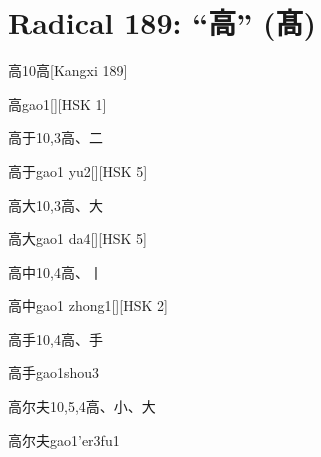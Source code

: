 
\section*{Radical 189: ``⾼'' (髙)}

\begin{entry}{高}{10}{⾼}[Kangxi 189]
  \begin{phonetics}{高}{gao1}[][HSK 1]
  \end{phonetics}
\end{entry}

\begin{entry}{高于}{10,3}{⾼、⼆}
  \begin{phonetics}{高于}{gao1 yu2}[][HSK 5]
  \end{phonetics}
\end{entry}

\begin{entry}{高大}{10,3}{⾼、⼤}
  \begin{phonetics}{高大}{gao1 da4}[][HSK 5]
  \end{phonetics}
\end{entry}

\begin{entry}{高中}{10,4}{⾼、⼁}
  \begin{phonetics}{高中}{gao1 zhong1}[][HSK 2]
  \end{phonetics}
\end{entry}

\begin{entry}{高手}{10,4}{⾼、⼿}
  \begin{phonetics}{高手}{gao1shou3}
  \end{phonetics}
\end{entry}

\begin{entry}{高尔夫}{10,5,4}{⾼、⼩、⼤}
  \begin{phonetics}{高尔夫}{gao1'er3fu1}
  \end{phonetics}
\end{entry}


